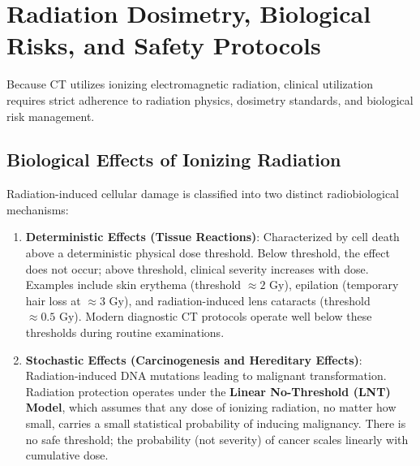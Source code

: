 \documentclass[11pt,a4paper]{article}
\begin{document}
\section{Radiation Dosimetry, Biological Risks, and Safety Protocols}

Because CT utilizes ionizing electromagnetic radiation, clinical utilization requires strict adherence to radiation physics, dosimetry standards, and biological risk management.

\subsection{Biological Effects of Ionizing Radiation}
Radiation-induced cellular damage is classified into two distinct radiobiological mechanisms:
\begin{enumerate}
    \item \textbf{Deterministic Effects (Tissue Reactions)}: Characterized by cell death above a deterministic physical dose threshold. Below threshold, the effect does not occur; above threshold, clinical severity increases with dose. Examples include skin erythema (threshold $\approx 2\text{ Gy}$), epilation (temporary hair loss at $\approx 3\text{ Gy}$), and radiation-induced lens cataracts (threshold $\approx 0.5\text{ Gy}$). Modern diagnostic CT protocols operate well below these thresholds during routine examinations.
    \item \textbf{Stochastic Effects (Carcinogenesis and Hereditary Effects)}: Radiation-induced DNA mutations leading to malignant transformation. Radiation protection operates under the \textbf{Linear No-Threshold (LNT) Model}, which assumes that any dose of ionizing radiation, no matter how small, carries a small statistical probability of inducing malignancy. There is no safe threshold; the probability (not severity) of cancer scales linearly with cumulative dose.
\end{enumerate}
\end{document}

